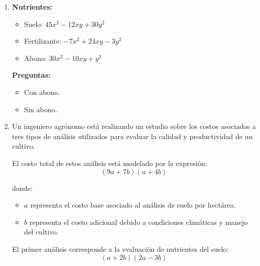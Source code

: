 \documentclass[11pt]{article}
\begin{document}
\begin{enumerate}
		\textbf{Actividades:}
		\begin{enumerate}[label=\alph*)]
			\item Simplifique cada una de las expresiones algebraicas.
			\item Identifique el tipo de operación utilizada en cada caso (productos notables, reducción de términos, etc.).
			\item Determine cuál de las charlas tuvo mayor número de asistentes en términos algebraicos.
			\item Analice si existen inconsistencias o redundancias en las expresiones dadas.
		\end{enumerate}
		
		\item \textbf{Nutrientes:}
		
		\begin{itemize}
			\item Suelo: $45x^2 - 12xy + 30y^2$
			\item Fertilizante: $-7x^2 + 24xy - 3y^2$
			\item Abono: $30x^2 - 10xy + y^2$
		\end{itemize}
		
		\textbf{Preguntas:}
		\begin{itemize}
			\item Con abono.
			\item Sin abono.
		\end{itemize}
		
		\newpage
		
		\vspace*{0.2em}
		
		\item Un ingeniero agrónomo está realizando un estudio sobre los costos asociados a tres tipos de análisis utilizados para evaluar la calidad y productividad de un cultivo.
		
		El costo total de estos análisis está modelado por la expresión:
		\[
		(9a + 7b)(a + 4b)
		\]
		
		donde:
		\begin{itemize}
			\item $a$ representa el costo base asociado al análisis de suelo por hectárea.
			\item $b$ representa el costo adicional debido a condiciones climáticas y manejo del cultivo.
		\end{itemize}
		
		El primer análisis corresponde a la evaluación de nutrientes del suelo:
		\[
		(a + 2b)(2a - 3b)
		\]
		

\end{enumerate}
\end{document}
